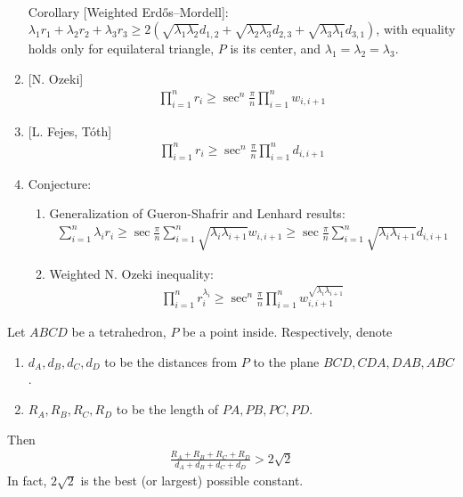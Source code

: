 \documentclass{treatise}
\begin{document}
\begin{shaded}
\begin{theorem}
\begin{enumerate}
\begin{align*}
	\end{align*}
	Corollary [Weighted Erdős–Mordell]: $\lambda_1 r_1 + \lambda_2 r_2 + \lambda_3 r_3 \geq 2 (\sqrt{\lambda_1 \lambda_2} d_{1, 2} + \sqrt{\lambda_2 \lambda_3} d_{2, 3} + \sqrt{\lambda_3 \lambda_1} d_{3, 1})$, with equality holds only for equilateral triangle, $P$ is its center, and $\lambda_1 = \lambda_2 = \lambda_3$.
	\item {[N. Ozeki]}
	\begin{align*}
	\prod_{i = 1}^n r_i \geq \sec^n \frac{\pi}{n} \prod_{i = 1}^n w_{i, i + 1}
	\end{align*}
	\item {[L. Fejes, Tóth]}
	\begin{align*}
	\prod_{i = 1}^n r_i \geq \sec^n \frac{\pi}{n} \prod_{i = 1}^n d_{i, i + 1}
	\end{align*}
	\item Conjecture:
	\begin{enumerate}
		\item Generalization of Gueron-Shafrir and Lenhard results:
		\begin{align*}
		\sum_{i = 1}^n \lambda_i r_i \geq \sec \frac{\pi}{n} \sum_{i = 1}^n \sqrt{\lambda_i \lambda_{i + 1}} w_{i, i + 1} \geq \sec \frac{\pi}{n} \sum_{i = 1}^n \sqrt{\lambda_i \lambda_{i + 1}} d_{i, i + 1}
		\end{align*}
		\item Weighted N. Ozeki inequality:
		\begin{align*}
		\prod_{i = 1}^n r_i^{\lambda_i} \geq \sec^n \frac{\pi}{n} \prod_{i = 1}^n w_{i, i + 1}^{\sqrt{\lambda_i \lambda_{i + 1}}}
		\end{align*}		
	\end{enumerate}
\end{enumerate}
\end{theorem}
\begin{theorem}[Kazarinoff]
Let $ABCD$ be a tetrahedron, $P$ be a point inside. Respectively, denote
\begin{enumerate}
	\item $d_A, d_B, d_C, d_D$ to be the distances from $P$ to the plane $BCD, CDA, DAB, ABC$.
	\item $R_A, R_B, R_C, R_D$ to be the length of $PA, PB, PC, PD$.
\end{enumerate}
Then
\begin{align*}
\frac{R_A + R_B + R_C + R_D}{d_A + d_B + d_C + d_D} > 2 \sqrt{2}
\end{align*}
In fact, $2 \sqrt{2}$ is the best (or largest) possible constant.

\end{theorem}
\end{shaded}
\end{document}
